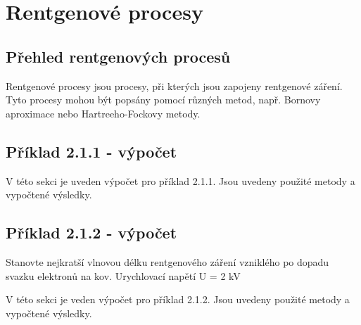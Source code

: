 \section{Rentgenové procesy}

\subsection{Přehled rentgenových procesů}

Rentgenové procesy jsou procesy, při kterých jsou zapojeny rentgenové záření. Tyto procesy mohou být popsány pomocí různých metod, např. Bornovy aproximace nebo Hartreeho-Fockovy metody.

\subsection{Příklad 2.1.1 - výpočet}
\begin{zadani}

\end{zadani}


V této sekci je uveden výpočet pro příklad 2.1.1. Jsou uvedeny použité metody a vypočtené výsledky.

\subsection{Příklad 2.1.2 - výpočet}
\begin{zadani}
    Stanovte nejkratší vlnovou délku rentgenového záření vzniklého 
    po dopadu svazku elektronů na kov. Urychlovací napětí  U = 2 kV
\end{zadani}


V této sekci je veden výpočet pro příklad 2.1.2. Jsou uvedeny použité metody a vypočtené výsledky.
